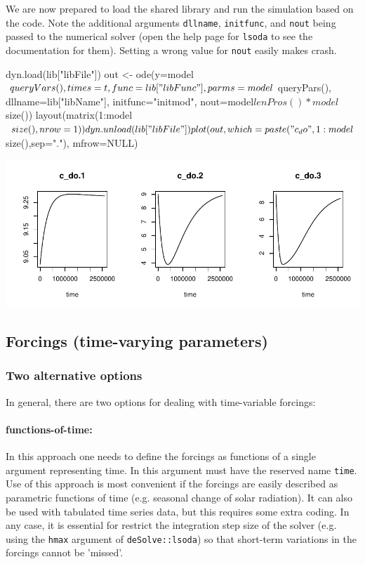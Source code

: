 \documentclass[onecolumn]{article}
\begin{document}
We are now prepared to load the shared library and run the simulation based on the  code. Note the additional arguments \verb|dllname|, \verb|initfunc|, and \verb|nout| being passed to the numerical solver (open the help page for \verb|lsoda| to see the documentation for them). Setting a wrong value for \verb|nout| easily makes  crash.

\begin{Schunk}
\begin{Sinput}
 dyn.load(lib["libFile"])
 out <- ode(y=model$queryVars(), times=t, func=lib["libFunc"],
   parms=model$queryPars(), dllname=lib["libName"],
   initfunc="initmod", nout=model$lenPros()*model$size())
 layout(matrix(1:model$size(), nrow=1))
 dyn.unload(lib["libFile"])
 plot(out, which=paste("c_do",1:model$size(),sep="."), mfrow=NULL)
\end{Sinput}
\end{Schunk}
\includegraphics{rodeo-021}



\subsection{Forcings (time-varying parameters)} \label{sec:advanced:forcings}

\subsubsection{Two alternative options}
In general, there are two options for dealing with time-variable forcings:

\paragraph{functions-of-time:} In this approach one needs to define the forcings as functions of a single argument representing time. In  this argument must have the reserved name \verb|time|. Use of this approach is most convenient if the forcings are easily described as parametric functions of time (e.g. seasonal change of solar radiation). It can also be used with tabulated time series data, but this requires some extra coding. In any case, it is essential for restrict the integration step size of the solver (e.g. using the \verb|hmax| argument of \verb|deSolve::lsoda|) so that short-term variations in the forcings cannot be 'missed'.
 
\end{document}
